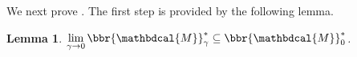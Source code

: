 \documentclass[letterpaper]{article} %
\theoremstyle{plain}
\newtheorem{lemma}[theorem]{Lemma}
\theoremstyle{definition}
\theoremstyle{remark}
\newcommand{\dg}[1]{\mathbdcal{#1}}
\newcommand\Inc{\mathit{Inc}}
\begin{document}
%
We next prove .  The first step is provided by the
following lemma.
\begin{lemma}\label{lem:gamma2zero}
 $\lim\limits_{\gamma\to0}\bbr{\dg M}_\gamma^* \subseteq \bbr{\dg M}_0^*$. 
\end{lemma}
\end{document}
